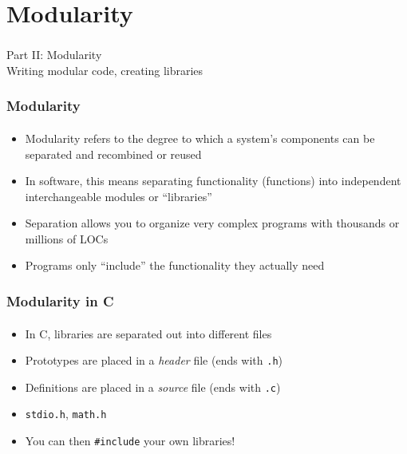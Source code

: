 \documentclass[]{beamer}
\begin{document}
\section{Modularity}

\begin{frame}
    \frametitle{}
    \framesubtitle{}
    
    \begin{center}
    {\Huge Part II: Modularity}\\
    {\Large Writing modular code, creating libraries}
    \end{center}

\end{frame}

\begin{frame}[fragile]
    \frametitle{Modularity}
    \framesubtitle{}
    
\begin{itemize}[<+->]
  \item Modularity refers to the degree to which a system's components 
    can be separated and recombined or reused
  \item In software, this means separating functionality (functions) into
    independent interchangeable modules or ``libraries''
  \item Separation allows you to organize very complex programs
    with thousands or millions of LOCs
  \item Programs only ``include'' the functionality they actually need
\end{itemize}  
  
\end{frame}

\begin{frame}[fragile]
    \frametitle{Modularity in C}
    \framesubtitle{}
    
\begin{itemize}[<+->]
  \item In C, libraries are separated out into different files
  \item Prototypes are placed in a \emph{header} file (ends with \texttt{.h})
  \item Definitions are placed in a \emph{source} file (ends with \texttt{.c})
  \item \texttt{stdio.h}, \texttt{math.h}
  \item You can then \texttt{#include} your own libraries!
\end{itemize}

\end{frame}
\end{document}
